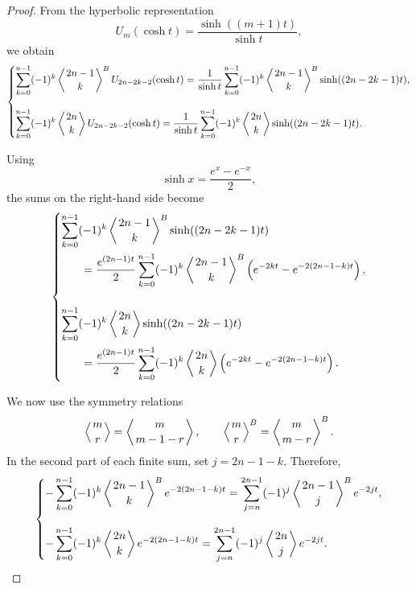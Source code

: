 \documentclass[11pt,twoside]{article}
\numberwithin{equation}{section}
\begin{document}
\begin{proof}
From the hyperbolic representation
\[
U_m(\cosh t)
=
\frac{\sinh((m+1)t)}{\sinh t},
\]
we obtain
\begin{equation}\label{eq:Euler-Cheb-hyperbolic}
\begin{dcases}
\displaystyle
\sum_{k=0}^{n-1}
(-1)^k
\left\langle {2n-1\atop k}\right\rangle^{B}
U_{2n-2k-2}(\cosh t)
=
\frac{1}{\sinh t}
\sum_{k=0}^{n-1}
(-1)^k
\left\langle {2n-1\atop k}\right\rangle^{B}
\sinh((2n-2k-1)t),
\\[2ex]
\displaystyle
\sum_{k=0}^{n-1}
(-1)^k
\left\langle {2n\atop k}\right\rangle
U_{2n-2k-2}(\cosh t)
=
\frac{1}{\sinh t}
\sum_{k=0}^{n-1}
(-1)^k
\left\langle {2n\atop k}\right\rangle
\sinh((2n-2k-1)t).
\end{dcases}
\end{equation}

Using
\[
\sinh x=\frac{e^x-e^{-x}}{2},
\]
the sums on the right-hand side become
\begin{equation}\label{eq:Euler-Cheb-exponential}
\begin{dcases}
\displaystyle
\sum_{k=0}^{n-1}
(-1)^k
\left\langle {2n-1\atop k}\right\rangle^{B}
\sinh((2n-2k-1)t)
\\
\displaystyle\qquad
=
\frac{e^{(2n-1)t}}{2}
\sum_{k=0}^{n-1}
(-1)^k
\left\langle {2n-1\atop k}\right\rangle^{B}
\left(
e^{-2kt}
-
e^{-2(2n-1-k)t}
\right),
\\[3ex]
\displaystyle
\sum_{k=0}^{n-1}
(-1)^k
\left\langle {2n\atop k}\right\rangle
\sinh((2n-2k-1)t)
\\
\displaystyle\qquad
=
\frac{e^{(2n-1)t}}{2}
\sum_{k=0}^{n-1}
(-1)^k
\left\langle {2n\atop k}\right\rangle
\left(
e^{-2kt}
-
e^{-2(2n-1-k)t}
\right).
\end{dcases}
\end{equation}

We now use the symmetry relations \cite{FulmanLeeKimPetersen2021}
\[
\left\langle{m\atop r}\right\rangle=\left\langle{m\atop m-1-r}\right\rangle,
\qquad
\left\langle{m\atop r}\right\rangle^{B}=\left\langle{m\atop m-r}\right\rangle^{B}.
\]
In the second part of each finite sum, set \(j=2n-1-k.\) Therefore,
\begin{equation}
\begin{dcases}
\displaystyle
-\sum_{k=0}^{n-1}(-1)^k
\left\langle {2n-1\atop k}\right\rangle^{B}
e^{-2(2n-1-k)t}
=
\sum_{j=n}^{2n-1}(-1)^j
\left\langle {2n-1\atop j}\right\rangle^{B}
e^{-2jt},
\\[2ex]
\displaystyle
-\sum_{k=0}^{n-1}(-1)^k
\left\langle {2n\atop k}\right\rangle
e^{-2(2n-1-k)t}
=
\sum_{j=n}^{2n-1}(-1)^j
\left\langle {2n\atop j}\right\rangle
e^{-2jt}.
\end{dcases}
\end{equation}


\end{proof}
\end{document}
